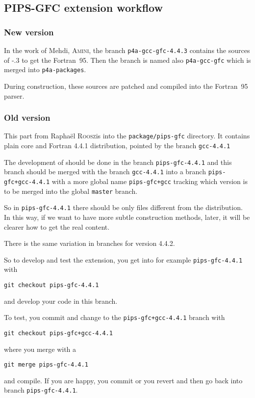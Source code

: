 \documentclass[a4paper]{article}
\begin{document}
\subsection{PIPS-GFC extension workflow}
\label{sec:pips-gfc-workflow}

\subsubsection{New version}
\label{sec:new-version}

In the work of Mehdi, \textsc{Amini}, the branch
\texttt{p4a-gcc-gfc-4.4.3} contains the sources of \Agcc-.3 to
get the Fortran~95. Then the branch is named also \texttt{p4a-gcc-gfc}
which is merged into \texttt{p4a-packages}.

During \Apfa construction, these sources are patched and compiled into the
\Apips Fortran~95 parser.


\subsubsection{Old version}
\label{sec:new-version}


This part from Raphaël \textsc{Roosz}is into the \texttt{package/pips-gfc}
directory. It contains plain \Agcc core and Fortran 4.4.1 distribution,
pointed by the branch \texttt{gcc-4.4.1}

The development of \Apipsgfc should be done in the branch
\texttt{pips-gfc-4.4.1} and this branch should be merged with the
branch \texttt{gcc-4.4.1} into a branch \texttt{pips-gfc+gcc-4.4.1} with a
more global name \texttt{pips-gfc+gcc} tracking which version is to be
merged into the global \texttt{master} branch.

So in \texttt{pips-gfc-4.4.1} there should be only files different from
the \Agcc distribution. In this way, if we want to have more subtle
construction methods, later, it will be clearer how to get the real
content.

There is the same variation in branches for version 4.4.2.

So to develop and test the \Apipsgfc extension, you get into for example
\texttt{pips-gfc-4.4.1} with
\begin{verbatim}
git checkout pips-gfc-4.4.1
\end{verbatim}
and develop your code in this branch.

To test, you commit and change to the \texttt{pips-gfc+gcc-4.4.1} branch with
\begin{verbatim}
git checkout pips-gfc+gcc-4.4.1
\end{verbatim}
where you merge with a
\begin{verbatim}
git merge pips-gfc-4.4.1
\end{verbatim}
and compile. If you are happy, you commit or you revert and then go back
into branch \texttt{pips-gfc-4.4.1}.
\end{document}
